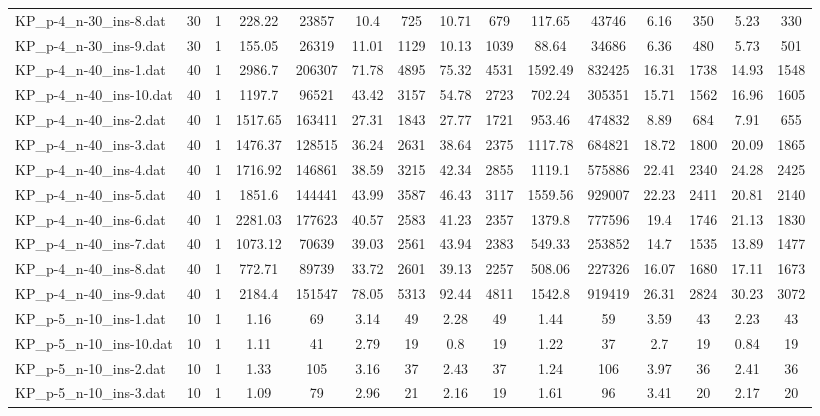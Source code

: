 \begin{table}[!ht]
{\begin{tabular}{lcccccccccccccc}
KP\_p-4\_n-30\_ins-8.dat & 30 & 1 & 228.22 & 23857 & 10.4 & 725 & 10.71 & 679 & 117.65 & 43746 & 6.16 & 350 & 5.23 & 330 \\
KP\_p-4\_n-30\_ins-9.dat & 30 & 1 & 155.05 & 26319 & 11.01 & 1129 & 10.13 & 1039 & 88.64 & 34686 & 6.36 & 480 & 5.73 & 501 \\
KP\_p-4\_n-40\_ins-1.dat & 40 & 1 & 2986.7 & 206307 & 71.78 & 4895 & 75.32 & 4531 & 1592.49 & 832425 & 16.31 & 1738 & 14.93 & 1548 \\
KP\_p-4\_n-40\_ins-10.dat & 40 & 1 & 1197.7 & 96521 & 43.42 & 3157 & 54.78 & 2723 & 702.24 & 305351 & 15.71 & 1562 & 16.96 & 1605 \\
KP\_p-4\_n-40\_ins-2.dat & 40 & 1 & 1517.65 & 163411 & 27.31 & 1843 & 27.77 & 1721 & 953.46 & 474832 & 8.89 & 684 & 7.91 & 655 \\
KP\_p-4\_n-40\_ins-3.dat & 40 & 1 & 1476.37 & 128515 & 36.24 & 2631 & 38.64 & 2375 & 1117.78 & 684821 & 18.72 & 1800 & 20.09 & 1865 \\
KP\_p-4\_n-40\_ins-4.dat & 40 & 1 & 1716.92 & 146861 & 38.59 & 3215 & 42.34 & 2855 & 1119.1 & 575886 & 22.41 & 2340 & 24.28 & 2425 \\
KP\_p-4\_n-40\_ins-5.dat & 40 & 1 & 1851.6 & 144441 & 43.99 & 3587 & 46.43 & 3117 & 1559.56 & 929007 & 22.23 & 2411 & 20.81 & 2140 \\
KP\_p-4\_n-40\_ins-6.dat & 40 & 1 & 2281.03 & 177623 & 40.57 & 2583 & 41.23 & 2357 & 1379.8 & 777596 & 19.4 & 1746 & 21.13 & 1830 \\
KP\_p-4\_n-40\_ins-7.dat & 40 & 1 & 1073.12 & 70639 & 39.03 & 2561 & 43.94 & 2383 & 549.33 & 253852 & 14.7 & 1535 & 13.89 & 1477 \\
KP\_p-4\_n-40\_ins-8.dat & 40 & 1 & 772.71 & 89739 & 33.72 & 2601 & 39.13 & 2257 & 508.06 & 227326 & 16.07 & 1680 & 17.11 & 1673 \\
KP\_p-4\_n-40\_ins-9.dat & 40 & 1 & 2184.4 & 151547 & 78.05 & 5313 & 92.44 & 4811 & 1542.8 & 919419 & 26.31 & 2824 & 30.23 & 3072 \\
KP\_p-5\_n-10\_ins-1.dat & 10 & 1 & 1.16 & 69 & 3.14 & 49 & 2.28 & 49 & 1.44 & 59 & 3.59 & 43 & 2.23 & 43 \\
KP\_p-5\_n-10\_ins-10.dat & 10 & 1 & 1.11 & 41 & 2.79 & 19 & 0.8 & 19 & 1.22 & 37 & 2.7 & 19 & 0.84 & 19 \\
KP\_p-5\_n-10\_ins-2.dat & 10 & 1 & 1.33 & 105 & 3.16 & 37 & 2.43 & 37 & 1.24 & 106 & 3.97 & 36 & 2.41 & 36 \\
KP\_p-5\_n-10\_ins-3.dat & 10 & 1 & 1.09 & 79 & 2.96 & 21 & 2.16 & 19 & 1.61 & 96 & 3.41 & 20 & 2.17 & 20 \\

\end{tabular}}
\end{table}
